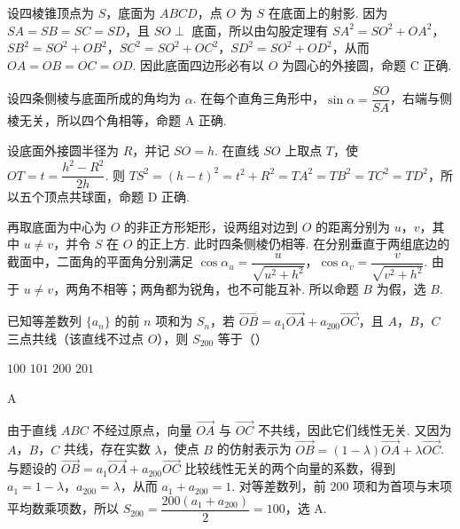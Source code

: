\begin{solution}
设四棱锥顶点为 \(S\)，底面为 \(ABCD\)，点 \(O\) 为 \(S\) 在底面上的射影. 因为 \(SA=SB=SC=SD\)，且 \(SO\perp\) 底面，所以由勾股定理有 \(SA^2=SO^2+OA^2\)，\(SB^2=SO^2+OB^2\)，\(SC^2=SO^2+OC^2\)，\(SD^2=SO^2+OD^2\)，从而 \(OA=OB=OC=OD\). 因此底面四边形必有以 \(O\) 为圆心的外接圆，命题 C 正确.

设四条侧棱与底面所成的角均为 \(\alpha\). 在每个直角三角形中，\(\sin\alpha=\dfrac{SO}{SA}\)，右端与侧棱无关，所以四个角相等，命题 A 正确.

设底面外接圆半径为 \(R\)，并记 \(SO=h\). 在直线 \(SO\) 上取点 \(T\)，使 \(OT=t=\dfrac{h^2-R^2}{2h}\). 则 \(TS^2=(h-t)^2=t^2+R^2=TA^2=TB^2=TC^2=TD^2\)，所以五个顶点共球面，命题 D 正确.

再取底面为中心为 \(O\) 的非正方形矩形，设两组对边到 \(O\) 的距离分别为 \(u\)，\(v\)，其中 \(u\ne v\)，并令 \(S\) 在 \(O\) 的正上方. 此时四条侧棱仍相等. 在分别垂直于两组底边的截面中，二面角的平面角分别满足 \(\cos\alpha_u=\dfrac{u}{\sqrt{u^2+h^2}}\)，\(\cos\alpha_v=\dfrac{v}{\sqrt{v^2+h^2}}\). 由于 \(u\ne v\)，两角不相等；两角都为锐角，也不可能互补. 所以命题 \(B\) 为假，选 \(B\).
\end{solution}

\begin{problem}
已知等差数列 \(\{a_{n}\}\) 的前 \(n\) 项和为 \(S_{n}\)，若 \(\overrightarrow{OB} = a_{1}\overrightarrow{OA} + a_{200}\overrightarrow{OC}\)，且 \(A\)，\(B\)，\(C\) 三点共线（该直线不过点 \(O\)），则 \(S_{200}\) 等于（\quad）

\choices
    {\(100\)}
    {\(101\)}
    {\(200\)}
    {\(201\)}
\end{problem}

\begin{answer}
A
\end{answer}

\begin{solution}
由于直线 \(ABC\) 不经过原点，向量 \(\overrightarrow{OA}\) 与 \(\overrightarrow{OC}\) 不共线，因此它们线性无关. 又因为 \(A\)，\(B\)，\(C\) 共线，存在实数 \(\lambda\)，使点 \(B\) 的仿射表示为 \(\overrightarrow{OB}=(1-\lambda)\overrightarrow{OA}+\lambda\overrightarrow{OC}\). 与题设的 \(\overrightarrow{OB}=a_1\overrightarrow{OA}+a_{200}\overrightarrow{OC}\) 比较线性无关的两个向量的系数，得到 \(a_1=1-\lambda\)，\(a_{200}=\lambda\)，从而 \(a_1+a_{200}=1\). 对等差数列，前 \(200\) 项和为首项与末项平均数乘项数，所以 \(S_{200}=\dfrac{200(a_1+a_{200})}{2}=100\)，选 A.
\end{solution}

